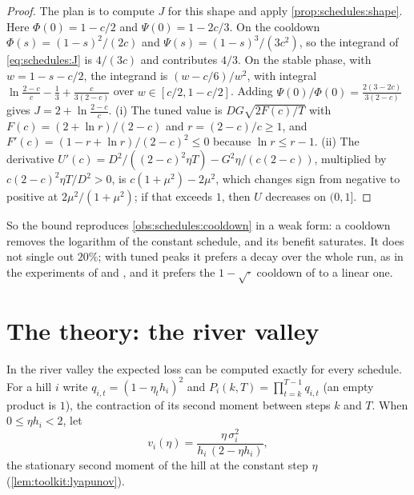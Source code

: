 \begin{refsection}
\begin{proof}
The plan is to compute $J$ for this shape and apply \cref{prop:schedules:shape}. Here $\Phi(0)=1-c/2$ and $\Psi(0)=1-2c/3$. On the cooldown $\Phi(s)=(1-s)^2/(2c)$ and $\Psi(s)=(1-s)^3/(3c^2)$, so the integrand of \eqref{eq:schedules:J} is $4/(3c)$ and contributes $4/3$. On the stable phase, with $w=1-s-c/2$, the integrand is $(w-c/6)/w^2$, with integral $\ln\frac{2-c}c-\frac13+\frac{c}{3(2-c)}$ over $w\in[c/2,1-c/2]$. Adding $\Psi(0)/\Phi(0)=\frac{2(3-2c)}{3(2-c)}$ gives $J=2+\ln\frac{2-c}c$.
(i) The tuned value is $DG\sqrt{2F(c)/T}$ with $F(c)=(2+\ln r)/(2-c)$ and $r=(2-c)/c\ge1$, and $F'(c)=(1-r+\ln r)/(2-c)^2\le0$ because $\ln r\le r-1$.
(ii) The derivative $U'(c)=D^2/((2-c)^2\eta T)-G^2\eta/(c(2-c))$, multiplied by $c(2-c)^2\eta T/D^2>0$, is $c(1+\mu^2)-2\mu^2$, which changes sign from negative to positive at $2\mu^2/(1+\mu^2)$; if that exceeds $1$, then $U$ decreases on $(0,1]$.
\end{proof}

So the bound reproduces \cref{obs:schedules:cooldown} in a weak form: a cooldown removes the logarithm of the constant schedule, and its benefit saturates. It does not single out $20\%$; with tuned peaks it prefers a decay over the whole run, as in the experiments of \textcite{DefazioEtAl2023} and \textcite{BergsmaEtAl2025}, and it prefers the $1-\sqrt\cdot$ cooldown of \textcite{HageleEtAl2024} to a linear one.

\section{The theory: the river valley}\label{sec:schedules:river}

In the river valley the expected loss can be computed exactly for every schedule. For a hill $i$ write $q_{i,t}=(1-\eta_th_i)^2$ and $P_i(k,T)=\prod_{t=k}^{T-1}q_{i,t}$ (an empty product is $1$), the contraction of its second moment between steps $k$ and $T$. When $0\le\eta h_i<2$, let
\[
  v_i(\eta)=\frac{\eta\,\sigma_i^2}{h_i\,(2-\eta h_i)} ,
\]
the stationary second moment of the hill at the constant step $\eta$ (\cref{lem:toolkit:lyapunov}).


\end{refsection}
